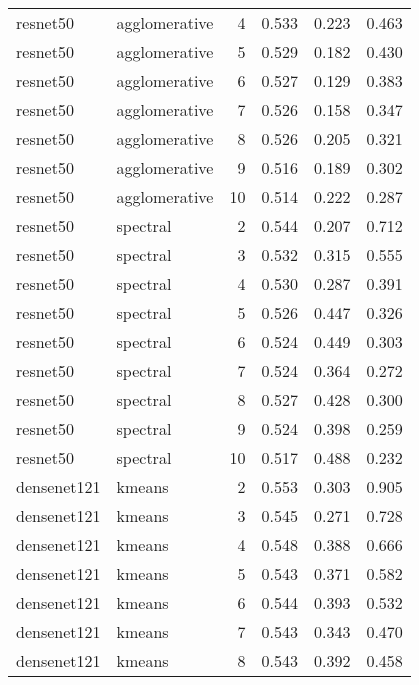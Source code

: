 \begin{longtable}{llrrrr}
   resnet50 & agglomerative &  4 &            0.533 &   0.223 &    0.463 \\
   resnet50 & agglomerative &  5 &            0.529 &   0.182 &    0.430 \\
   resnet50 & agglomerative &  6 &            0.527 &   0.129 &    0.383 \\
   resnet50 & agglomerative &  7 &            0.526 &   0.158 &    0.347 \\
   resnet50 & agglomerative &  8 &            0.526 &   0.205 &    0.321 \\
   resnet50 & agglomerative &  9 &            0.516 &   0.189 &    0.302 \\
   resnet50 & agglomerative & 10 &            0.514 &   0.222 &    0.287 \\
   resnet50 &      spectral &  2 &            0.544 &   0.207 &    0.712 \\
   resnet50 &      spectral &  3 &            0.532 &   0.315 &    0.555 \\
   resnet50 &      spectral &  4 &            0.530 &   0.287 &    0.391 \\
   resnet50 &      spectral &  5 &            0.526 &   0.447 &    0.326 \\
   resnet50 &      spectral &  6 &            0.524 &   0.449 &    0.303 \\
   resnet50 &      spectral &  7 &            0.524 &   0.364 &    0.272 \\
   resnet50 &      spectral &  8 &            0.527 &   0.428 &    0.300 \\
   resnet50 &      spectral &  9 &            0.524 &   0.398 &    0.259 \\
   resnet50 &      spectral & 10 &            0.517 &   0.488 &    0.232 \\
densenet121 &        kmeans &  2 &            0.553 &   0.303 &    0.905 \\
densenet121 &        kmeans &  3 &            0.545 &   0.271 &    0.728 \\
densenet121 &        kmeans &  4 &            0.548 &   0.388 &    0.666 \\
densenet121 &        kmeans &  5 &            0.543 &   0.371 &    0.582 \\
densenet121 &        kmeans &  6 &            0.544 &   0.393 &    0.532 \\
densenet121 &        kmeans &  7 &            0.543 &   0.343 &    0.470 \\
densenet121 &        kmeans &  8 &            0.543 &   0.392 &    0.458 \\

\end{longtable}
